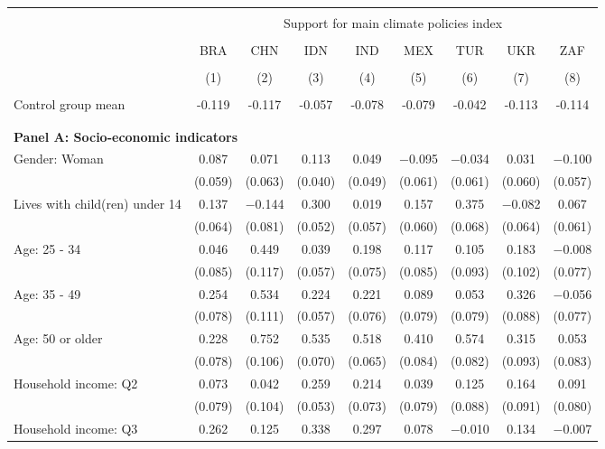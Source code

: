 
\begin{tabular}{@{\extracolsep{5pt}}lcccccccc} 
\\[-1.8ex]\hline 
\hline \\[-1.8ex] 
 & \multicolumn{8}{c}{Support for main climate policies index} \\ 
\cline{2-9} 
\\[-1.8ex] & BRA & CHN & IDN & IND & MEX & TUR & UKR & ZAF \\ 
\\[-1.8ex] & (1) & (2) & (3) & (4) & (5) & (6) & (7) & (8)\\ 
\hline \\[-1.8ex] 
Control group mean & -0.119 & -0.117 & -0.057 & -0.078 & -0.079 & -0.042 & -0.113 & -0.114   \\ \hline \\[-1.8ex]
\\[1ex]
\multicolumn{ 9 }{l}{\textbf{ Panel A: Socio-economic indicators }} \\
 Gender: Woman & 0.087 & 0.071 & 0.113 & 0.049 & $-$0.095 & $-$0.034 & 0.031 & $-$0.100 \\ 
  & (0.059) & (0.063) & (0.040) & (0.049) & (0.061) & (0.061) & (0.060) & (0.057) \\ 
  Lives with child(ren) under 14 & 0.137 & $-$0.144 & 0.300 & 0.019 & 0.157 & 0.375 & $-$0.082 & 0.067 \\ 
  & (0.064) & (0.081) & (0.052) & (0.057) & (0.060) & (0.068) & (0.064) & (0.061) \\ 
  Age: 25 - 34 & 0.046 & 0.449 & 0.039 & 0.198 & 0.117 & 0.105 & 0.183 & $-$0.008 \\ 
  & (0.085) & (0.117) & (0.057) & (0.075) & (0.085) & (0.093) & (0.102) & (0.077) \\ 
  Age: 35 - 49 & 0.254 & 0.534 & 0.224 & 0.221 & 0.089 & 0.053 & 0.326 & $-$0.056 \\ 
  & (0.078) & (0.111) & (0.057) & (0.076) & (0.079) & (0.079) & (0.088) & (0.077) \\ 
  Age: 50 or older & 0.228 & 0.752 & 0.535 & 0.518 & 0.410 & 0.574 & 0.315 & 0.053 \\ 
  & (0.078) & (0.106) & (0.070) & (0.065) & (0.084) & (0.082) & (0.093) & (0.083) \\ 
  Household income: Q2 & 0.073 & 0.042 & 0.259 & 0.214 & 0.039 & 0.125 & 0.164 & 0.091 \\ 
  & (0.079) & (0.104) & (0.053) & (0.073) & (0.079) & (0.088) & (0.091) & (0.080) \\ 
  Household income: Q3 & 0.262 & 0.125 & 0.338 & 0.297 & 0.078 & $-$0.010 & 0.134 & $-$0.007 \\ 

\end{tabular}
